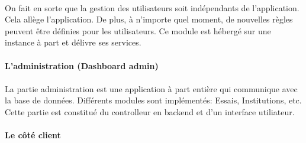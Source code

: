                 \paragraph{}
                On fait en sorte que la gestion des utilisateurs soit indépendants de l'application.
                Cela allège l'application. De plus, à n'importe quel moment, de nouvelles règles peuvent être définies
                pour les utilisateurs. Ce module est hébergé sur une instance à part et délivre ses services.
                \paragraph{L'administration (Dashboard admin)}
                \paragraph{}
                La partie administration est une application à part entière qui communique avec la base de données.
                Différents modules sont implémentés: Essais, Institutions, etc. Cette partie est constitué du controlleur
                en backend et d'un interface utiliateur.
                \paragraph{Le côté client}
                

        
 